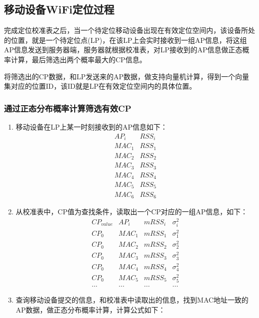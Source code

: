\documentclass[UTF8, twocolumn ]{ctexart}
\begin{document}
\subsection{移动设备WiFi定位过程}
完成定位校准表之后，当一个待定位移动设备出现在有效定位空间内，该设备所处的位置，就是一个待定位点(LP)，在该LP上会实时接收到一组AP信息，将这组AP信息发送到服务器端，服务器就根据校准表，对LP接收到的AP信息做正态概率计算，最后筛选出两个概率最大的CP信息。
\par
将筛选出的CP数据，和LP发送来的AP数据，做支持向量机计算，得到一个向量集对应的位置ID，该ID就是LP在有效定位空间内的具体位置。
\subsubsection{通过正态分布概率计算筛选有效CP}
\begin{enumerate}
\item 移动设备在LP上某一时刻接收到的AP信息如下：
  \begin{equation}
    \begin{array}{c|c}
      AP_{i} & RSS_{i} \\ \hline
      MAC_{1} & RSS_{1} \\
      MAC_{2} & RSS_{2} \\
      MAC_{3} & RSS_{3} \\
      MAC_{4} & RSS_{4} \\
      MAC_{5} & RSS_{5} \\
      MAC_{6} & RSS_{6}
    \end{array}
  \end{equation}
\item 从校准表中，CP值为查找条件，读取出一个CP对应的一组AP信息，如下：
  \begin{equation}
    \begin{array}{c|c|c|c}
      CP_{value} & AP_{i} & mRSS_{i} & \sigma^{2}_{i} \\ \hline
      CP_{0} & MAC_{1} & mRSS_{1} & \sigma^{2}_{1} \\
      CP_{0} & MAC_{2} & mRSS_{2} & \sigma^{2}_{2} \\
      CP_{0} & MAC_{3} & mRSS_{3} & \sigma^{2}_{3} \\
      CP_{0} & MAC_{4} & mRSS_{4} & \sigma^{2}_{4} \\
      CP_{0} & MAC_{5} & mRSS_{5} & \sigma^{2}_{5} \\
      ... & ... & ... & ...
    \end{array}
  \end{equation}
\item 查询移动设备提交的信息，和校准表中读取出的信息，找到MAC地址一致的AP数据，做正态分布概率计算，计算公式如下：

\end{enumerate}
\end{document}
